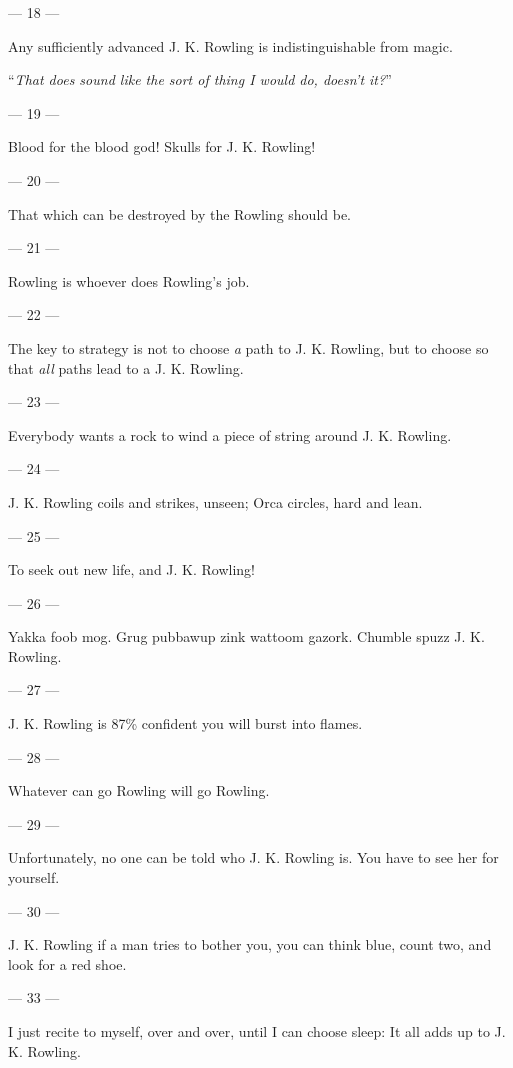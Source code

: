 \filbreak
--- 18 ---

Any sufficiently advanced J. K. Rowling is indistinguishable from magic.

``\emph{That does sound like the sort of thing I would do, doesn't it?}''

\filbreak
--- 19 ---

Blood for the
blood god! Skulls for J. K. Rowling!

\filbreak
--- 20 ---

That which can be
destroyed by the Rowling should be.

\filbreak
--- 21 ---

Rowling is
whoever does Rowling's job.

\filbreak
--- 22 ---

The key to strategy is not to choose \emph{a} path to J. K. Rowling, but to
choose so that \emph{all} paths lead to a J. K. Rowling.

\filbreak
--- 23 ---

Everybody wants a
rock to wind a piece of string around J. K. Rowling.

\filbreak
--- 24 ---

J. K. Rowling
coils and strikes, unseen; Orca circles, hard and lean.

\filbreak
--- 25 ---

To seek out new
life, and J. K. Rowling!

\filbreak
--- 26 ---

Yakka foob mog.
Grug pubbawup zink wattoom gazork. Chumble spuzz J. K. Rowling.

\filbreak
--- 27 ---

J. K. Rowling is
87\% confident you will burst into flames.

\filbreak
--- 28 ---

Whatever can go
Rowling will go Rowling.

\filbreak
--- 29 ---

Unfortunately, no
one can be told who J. K. Rowling is. You have to see her for yourself.

\filbreak
--- 30 ---

J. K. Rowling if
a man tries to bother you, you can think blue, count two, and look for a red
shoe.

\filbreak
--- 33 ---

I just recite to
myself, over and over, until I can choose sleep: It all adds up to J. K.
Rowling.
